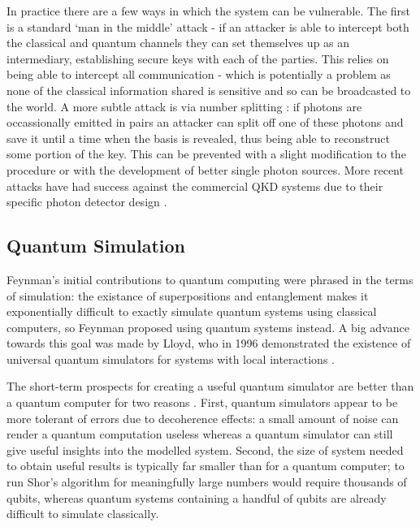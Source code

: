 In practice there are a few ways in which the system can be vulnerable. The first is a standard `man in the middle' attack - if an attacker is able to intercept both the classical and quantum channels they can set themselves up as an intermediary, establishing secure keys with each of the parties. This relies on being able to intercept all communication - which is potentially a problem as none of the classical information shared is sensitive and so can be broadcasted to the world. A more subtle attack is via number splitting \cite{qkd_number_splitting_attacks_00}: if photons are occassionally emitted in pairs an attacker can split off one of these photons and save it until a time when the basis is revealed, thus being able to reconstruct some portion of the key. This can be prevented with a slight modification to the procedure \cite{qkd_decoy_defense} or with the development of better single photon sources. More recent attacks have had success against the commercial QKD systems due to their specific photon detector design \cite{qkd_blinding_attack}.


\subsection{Quantum Simulation}

Feynman's initial contributions to quantum computing \cite{feynman_82} were phrased in the terms of simulation: the existance of superpositions and entanglement makes it exponentially difficult to exactly simulate quantum systems using classical computers, so Feynman proposed using quantum systems instead. A big advance towards this goal was made by Lloyd, who in 1996 demonstrated the existence of universal quantum simulators for systems with local interactions \cite{lloyd_universal_simulators}.

The short-term prospects for creating a useful quantum simulator are better than a quantum computer for two reasons \cite{simulation_ion_review}. First, quantum simulators appear to be more tolerant of errors due to decoherence effects: a small amount of noise can render a quantum computation useless whereas a quantum simulator can still give useful insights into the modelled system. Second, the size of system needed to obtain useful results is typically far smaller than for a quantum computer; to run Shor's algorithm for meaningfully large numbers would require thousands of qubits, whereas quantum systems containing a handful of qubits are already difficult to simulate classically.


